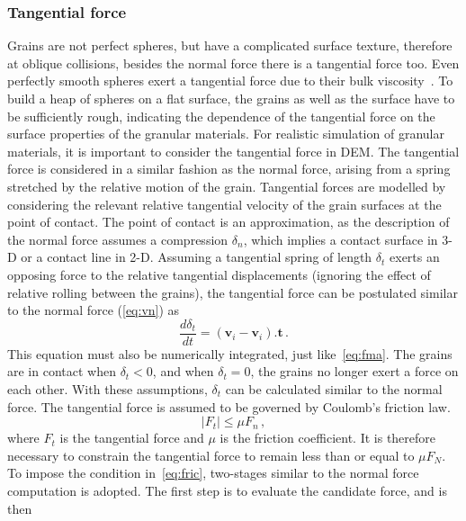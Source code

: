 \subsubsection*{Tangential force}
Grains are not perfect spheres, but have a complicated surface 
texture, therefore at oblique collisions, besides the normal force there is a 
tangential force too. Even perfectly smooth spheres exert a tangential force 
due to their bulk viscosity~\citep{Poschel2005}. To build a heap of 
spheres on a flat surface, the grains as well as the surface have to be 
sufficiently rough, indicating the dependence of the tangential force on the 
surface properties of the granular materials. For realistic simulation of 
granular materials, it is important to consider the tangential force in 
DEM. The tangential force is considered in a similar 
fashion as the normal force, arising from a spring stretched by the relative 
motion of the grain. Tangential forces are modelled by considering the relevant 
relative tangential velocity of the grain surfaces at the point of contact. The 
point of contact is an approximation, as the description of the normal force 
assumes a compression $\delta_{n}$, which implies a contact surface in 3-D or a 
contact line in 2-D. Assuming a tangential spring of length $\delta_{t}$ exerts 
an opposing force to the relative tangential displacements (ignoring the effect 
of relative rolling between the grains), the tangential force can be postulated 
similar to the normal force (\cref{eq:vn}) as
%
\begin{equation}
\label{eq:vt}
\frac{d{\delta_{t}}}{dt}=(\mathbf{v}_{\mathit{i}}-\mathbf{v}_{\mathit{i}}).{\mathbf{t}}
 \,.
\end{equation}
%
This equation must also be numerically integrated, just like~\cref{eq:fma}. The 
grains are in contact when $\delta_{t}<0$, and when $\delta_{t}=0$, the grains 
no longer exert a force on each other. With these assumptions, $\delta_{t}$ can 
be calculated similar to the normal force. The tangential force is assumed to 
be governed by Coulomb's friction law.
%
\begin{equation}
\left|F_{\mathit{t}}\right|\le\mu F_{\mathit{n}} \,, \label{eq:fric}
\end{equation}
%
where $F_{\mathit{t}}$ is the tangential force and $\mu$ is the friction 
coefficient. It is therefore necessary to constrain the tangential force to 
remain less than or equal to $\mu F_{N}$. To impose the condition 
in~\cref{eq:fric}, two-stages similar to the normal force computation is 
adopted. The first step is to evaluate the candidate force, and is then 
